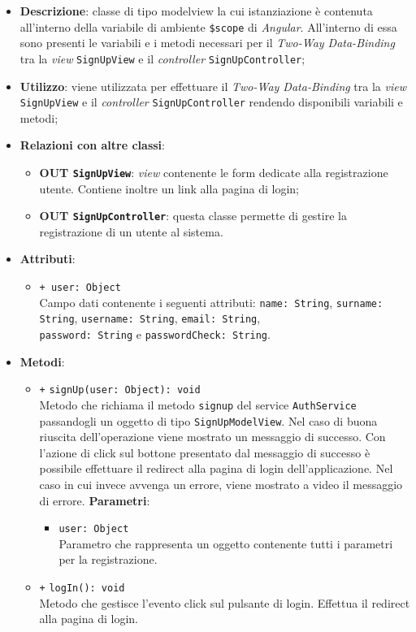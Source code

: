 	\begin{itemize}
		\item \textbf{Descrizione}: classe di tipo modelview la cui istanziazione è contenuta all'interno della variabile di ambiente \texttt{\$scope} di \textit{Angular}. All'interno di essa sono presenti le variabili e i metodi necessari per il \textit{Two-Way Data-Binding} tra la \textit{view} \texttt{SignUpView} e il \textit{controller} \texttt{SignUpController};
		\item \textbf{Utilizzo}: viene utilizzata per effettuare il \textit{Two-Way Data-Binding} tra la \textit{view} \texttt{SignUpView} e il \textit{controller} \texttt{SignUpController} rendendo disponibili variabili e metodi;
		\item \textbf{Relazioni con altre classi}: 
		\begin{itemize}
			\item \textbf{OUT \texttt{SignUpView}}: \textit{view} contenente le form dedicate alla registrazione utente. Contiene inoltre un link alla pagina di login; 
			\item \textbf{OUT \texttt{SignUpController}}: questa classe permette di gestire la registrazione di un utente al sistema.
		\end{itemize}
		\item \textbf{Attributi}: 
		\begin{itemize}
			\item \texttt{+ user: Object} \\ Campo dati contenente i seguenti attributi: \texttt{name: String}, \texttt{surname: String}, \texttt{username: String}, \texttt{email: String},\\ \texttt{password: String} e \texttt{passwordCheck: String}.
		\end{itemize}
		\item \textbf{Metodi}: 
		\begin{itemize}	
			\item \texttt{+} \texttt{signUp(user: Object): void} \\
			Metodo che richiama il metodo \texttt{signup} del service \texttt{AuthService} passandogli un oggetto di tipo \texttt{SignUpModelView}. Nel caso di buona riuscita dell'operazione viene mostrato un messaggio di successo. Con l'azione di click sul bottone presentato dal messaggio di successo è possibile effettuare il redirect alla pagina di login dell'applicazione. Nel caso in cui invece avvenga un errore, viene mostrato a video il messaggio di errore.
			\textbf{Parametri}:
			\begin{itemize}
				\item \texttt{user: Object} \\
				Parametro che rappresenta un oggetto contenente tutti i parametri per la registrazione.
			\end{itemize}
			\item \texttt{+} \texttt{logIn(): void} \\
			Metodo che gestisce l'evento click sul pulsante di login. Effettua il redirect alla pagina di login.
		\end{itemize}
	\end{itemize}
	
	